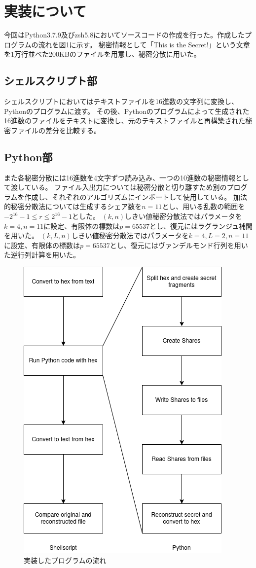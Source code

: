 \documentclass[twocolumn,a4paper]{jsarticle}
\begin{document}
	\section{実装について}
	今回はPython3.7.9及びzsh5.8においてソースコードの作成を行った。作成したプログラムの流れを図1に示す。
	秘密情報として「This is the Secret!」という文章を1万行並べた200KBのファイルを用意し、秘密分散に用いた。
	\subsection{シェルスクリプト部}
	シェルスクリプトにおいてはテキストファイルを16進数の文字列に変換し、Pythonのプログラムに渡す。
	その後、Pythonのプログラムによって生成された16進数のファイルをテキストに変換し、元のテキストファイルと再構築された秘密ファイルの差分を比較する。
	\subsection{Python部}
	また各秘密分散には16進数を4文字ずつ読み込み、一つの10進数の秘密情報として渡している。
	ファイル入出力については秘密分散と切り離すため別のプログラムを作成し、それぞれのアルゴリズムにインポートして使用している。
	加法的秘密分散法については生成するシェア数を$n=11$とし、用いる乱数の範囲を$-2^{16}-1{\leq}r{\leq}2^{16}-1$とした。
	$(k,n)$しきい値秘密分散法ではパラメータを$k=4,n=11$に設定、有限体の標数は$p=65537$とし、復元にはラグランジュ補間を用いた。
	$(k,L,n)$しきい値秘密分散法ではパラメータを$k=4,L=2,n=11$に設定、有限体の標数は$p=65537$とし、復元にはヴァンデルモンド行列を用いた逆行列計算を用いた。

	\begin{figure}[h]
		\centering
		\includegraphics[keepaspectratio,scale=0.5]{program.png}
		\caption{実装したプログラムの流れ}
	\end{figure}
\end{document}

